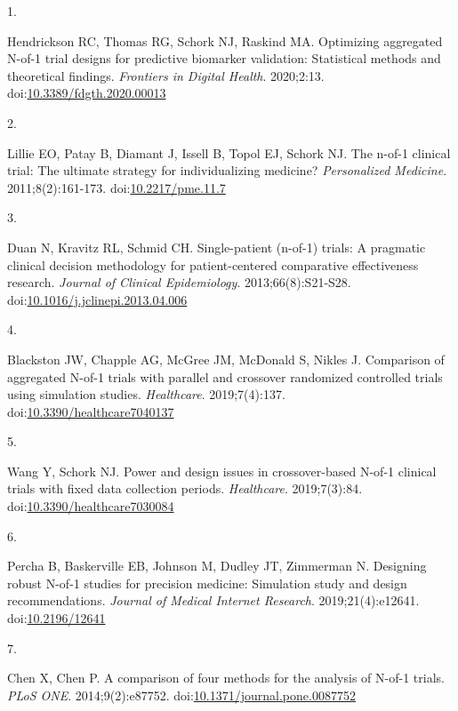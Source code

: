 \documentclass[
  11pt,
]{article}
\newlength{\cslhangindent}
\newlength{\csllabelwidth}
\newenvironment{CSLReferences}[2] %
 {\begin{list}{}{%
  \setlength{\itemindent}{0pt}
  \setlength{\leftmargin}{0pt}
  \setlength{\parsep}{0pt}
  \ifodd #1
   \setlength{\leftmargin}{\cslhangindent}
   \setlength{\itemindent}{-1\cslhangindent}
  \fi
  \setlength{\itemsep}{#2\baselineskip}}}
 {\end{list}}
\newcommand{\CSLLeftMargin}[1]{\parbox[t]{\csllabelwidth}{\strut#1\strut}}
\newcommand{\CSLRightInline}[1]{\parbox[t]{\linewidth - \csllabelwidth}{\strut#1\strut}}
\begin{document}
\protect{}\label{refs}
\begin{CSLReferences}{0}{1}
\CSLLeftMargin{1. }%
\CSLRightInline{Hendrickson RC, Thomas RG, Schork NJ, Raskind MA. Optimizing aggregated {N}-of-1 trial designs for predictive biomarker validation: Statistical methods and theoretical findings. \emph{Frontiers in Digital Health}. 2020;2:13. doi:\href{https://doi.org/10.3389/fdgth.2020.00013}{10.3389/fdgth.2020.00013}}

\CSLLeftMargin{2. }%
\CSLRightInline{Lillie EO, Patay B, Diamant J, Issell B, Topol EJ, Schork NJ. The n-of-1 clinical trial: The ultimate strategy for individualizing medicine? \emph{Personalized Medicine}. 2011;8(2):161-173. doi:\href{https://doi.org/10.2217/pme.11.7}{10.2217/pme.11.7}}

\CSLLeftMargin{3. }%
\CSLRightInline{Duan N, Kravitz RL, Schmid CH. Single-patient (n-of-1) trials: A pragmatic clinical decision methodology for patient-centered comparative effectiveness research. \emph{Journal of Clinical Epidemiology}. 2013;66(8):S21-S28. doi:\href{https://doi.org/10.1016/j.jclinepi.2013.04.006}{10.1016/j.jclinepi.2013.04.006}}

\CSLLeftMargin{4. }%
\CSLRightInline{Blackston JW, Chapple AG, McGree JM, McDonald S, Nikles J. Comparison of aggregated {N}-of-1 trials with parallel and crossover randomized controlled trials using simulation studies. \emph{Healthcare}. 2019;7(4):137. doi:\href{https://doi.org/10.3390/healthcare7040137}{10.3390/healthcare7040137}}

\CSLLeftMargin{5. }%
\CSLRightInline{Wang Y, Schork NJ. Power and design issues in crossover-based {N}-of-1 clinical trials with fixed data collection periods. \emph{Healthcare}. 2019;7(3):84. doi:\href{https://doi.org/10.3390/healthcare7030084}{10.3390/healthcare7030084}}

\CSLLeftMargin{6. }%
\CSLRightInline{Percha B, Baskerville EB, Johnson M, Dudley JT, Zimmerman N. Designing robust {N}-of-1 studies for precision medicine: Simulation study and design recommendations. \emph{Journal of Medical Internet Research}. 2019;21(4):e12641. doi:\href{https://doi.org/10.2196/12641}{10.2196/12641}}

\CSLLeftMargin{7. }%
\CSLRightInline{Chen X, Chen P. A comparison of four methods for the analysis of {N}-of-1 trials. \emph{PLoS ONE}. 2014;9(2):e87752. doi:\href{https://doi.org/10.1371/journal.pone.0087752}{10.1371/journal.pone.0087752}}


\end{CSLReferences}
\end{document}
